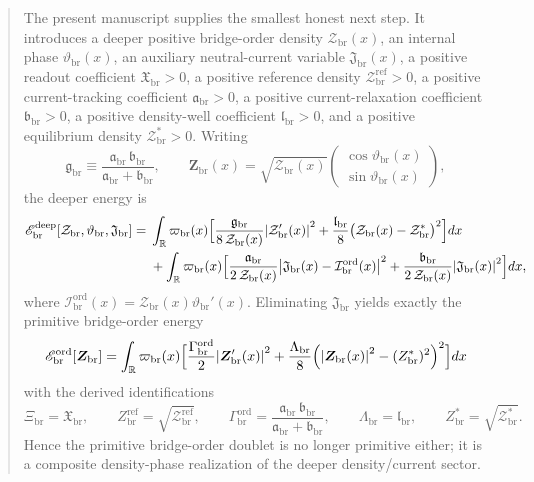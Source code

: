 \documentclass[11pt]{article}
\newcommand{\ProfWeight}{\varpi_{\mathrm{br}}}
\newcommand{\RespOrderField}{\bm Z_{\mathrm{br}}}
\newcommand{\RespOrderRef}{Z_{\mathrm{br}}^{\mathrm{ref}}}
\newcommand{\RespOrderEq}{Z_{\mathrm{br}}^{\ast}}
\newcommand{\RespOrderReadout}{\Xi_{\mathrm{br}}}
\newcommand{\RespOrderStiff}{\Gamma_{\mathrm{br}}^{\mathrm{ord}}}
\newcommand{\RespOrderQuartic}{\Lambda_{\mathrm{br}}}
\newcommand{\RespOrderEnergy}{\mathscr E_{\mathrm{br}}^{\mathrm{ord}}}
\newcommand{\RespOrderCurrent}{\mathcal I_{\mathrm{br}}^{\mathrm{ord}}}
\newcommand{\RespOrderPhase}{\vartheta_{\mathrm{br}}}
\newcommand{\RespDeepDensity}{\mathcal Z_{\mathrm{br}}}
\newcommand{\RespDeepDensityRef}{\mathcal Z_{\mathrm{br}}^{\mathrm{ref}}}
\newcommand{\RespDeepDensityEq}{\mathcal Z_{\mathrm{br}}^{\ast}}
\newcommand{\RespDeepReadout}{\mathfrak X_{\mathrm{br}}}
\newcommand{\RespDeepTrack}{\mathfrak a_{\mathrm{br}}}
\newcommand{\RespDeepRelax}{\mathfrak b_{\mathrm{br}}}
\newcommand{\RespDeepStiff}{\mathfrak g_{\mathrm{br}}}
\newcommand{\RespDeepWell}{\mathfrak l_{\mathrm{br}}}
\newcommand{\RespDeepAux}{\mathfrak J_{\mathrm{br}}}
\newcommand{\RespDeepEnergy}{\mathscr E_{\mathrm{br}}^{\mathrm{deep}}}
\begin{document}
\begin{abstract}
The present manuscript supplies the smallest honest next step. It introduces a deeper positive bridge-order density \(\RespDeepDensity(x)\), an internal phase \(\RespOrderPhase(x)\), an auxiliary neutral-current variable \(\RespDeepAux(x)\), a positive readout coefficient \(\RespDeepReadout>0\), a positive reference density \(\RespDeepDensityRef>0\), a positive current-tracking coefficient \(\RespDeepTrack>0\), a positive current-relaxation coefficient \(\RespDeepRelax>0\), a positive density-well coefficient \(\RespDeepWell>0\), and a positive equilibrium density \(\RespDeepDensityEq>0\). Writing
\[
\RespDeepStiff\equiv \frac{\RespDeepTrack\,\RespDeepRelax}{\RespDeepTrack+\RespDeepRelax},
\qquad
\RespOrderField(x)
=
\sqrt{\RespDeepDensity(x)}
\begin{pmatrix}
\cos\RespOrderPhase(x)\\
\sin\RespOrderPhase(x)
\end{pmatrix},
\]
the deeper energy is
\begin{align*}
\RespDeepEnergy[\RespDeepDensity,\RespOrderPhase,\RespDeepAux]
=\;&
\int_{\mathbb R}\ProfWeight(x)\Bigl[
\frac{\RespDeepStiff}{8\,\RespDeepDensity(x)}\abs{\RespDeepDensity'(x)}^2
+
\frac{\RespDeepWell}{8}\bigl(\RespDeepDensity(x)-\RespDeepDensityEq\bigr)^2
\Bigr]dx
\nonumber\\
&+
\int_{\mathbb R}\ProfWeight(x)\Bigl[
\frac{\RespDeepTrack}{2\,\RespDeepDensity(x)}\abs{\RespDeepAux(x)-\RespOrderCurrent(x)}^2
+
\frac{\RespDeepRelax}{2\,\RespDeepDensity(x)}\abs{\RespDeepAux(x)}^2
\Bigr]dx,
\end{align*}
where \(\RespOrderCurrent(x)=\RespDeepDensity(x)\RespOrderPhase'(x)\). Eliminating \(\RespDeepAux\) yields exactly the primitive bridge-order energy
\[
\RespOrderEnergy[\RespOrderField]
=
\int_{\mathbb R}\ProfWeight(x)\Bigl[
\frac{\RespOrderStiff}{2}\abs{\RespOrderField'(x)}^2
+
\frac{\RespOrderQuartic}{8}\Bigl(\abs{\RespOrderField(x)}^2-(\RespOrderEq)^2\Bigr)^2
\Bigr]dx
\]
with the derived identifications
\[
\RespOrderReadout=\RespDeepReadout,
\qquad
\RespOrderRef=\sqrt{\RespDeepDensityRef},
\qquad
\RespOrderStiff=\frac{\RespDeepTrack\,\RespDeepRelax}{\RespDeepTrack+\RespDeepRelax},
\qquad
\RespOrderQuartic=\RespDeepWell,
\qquad
\RespOrderEq=\sqrt{\RespDeepDensityEq}.
\]
Hence the primitive bridge-order doublet is no longer primitive either; it is a composite density-phase realization of the deeper density/current sector.


\end{abstract}
\end{document}
